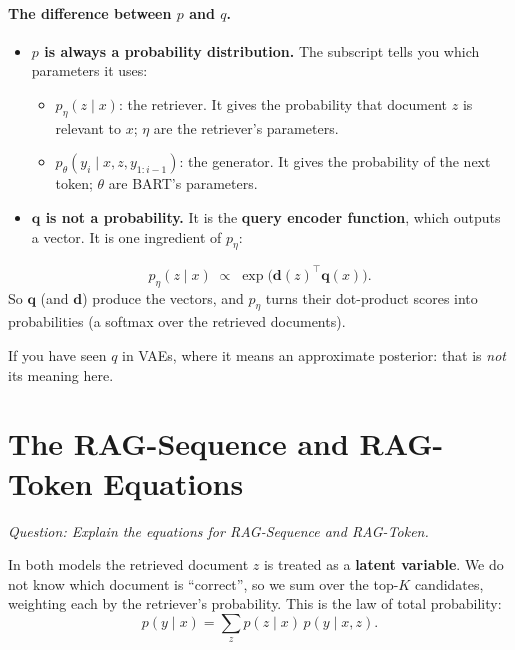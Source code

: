 \documentclass[11pt]{article}
\newcommand{\question}[1]{\noindent\textit{Question: #1}\par\medskip}
\begin{document}
\paragraph{The difference between $p$ and $q$.}
\begin{itemize}[nosep]
  \item \textbf{$p$ is always a probability distribution.} The subscript tells you which parameters it uses:
  \begin{itemize}[nosep]
    \item $p_\eta(z \mid x)$: the retriever. It gives the probability that document $z$ is relevant to $x$; $\eta$ are the retriever's parameters.
    \item $p_\theta(y_i \mid x, z, y_{1:i-1})$: the generator. It gives the probability of the next token; $\theta$ are BART's parameters.
  \end{itemize}
  \item \textbf{$\mathbf{q}$ is not a probability.} It is the \textbf{query encoder function}, which outputs a vector. It is one ingredient of $p_\eta$:
\end{itemize}
\begin{equation}
  p_\eta(z \mid x) \;\propto\; \exp\!\big(\mathbf{d}(z)^{\top}\mathbf{q}(x)\big).
\end{equation}
So $\mathbf{q}$ (and $\mathbf{d}$) produce the vectors, and $p_\eta$ turns their dot-product scores into probabilities (a softmax over the retrieved documents).

If you have seen $q$ in VAEs, where it means an approximate posterior: that is \emph{not} its meaning here.

\section{The RAG-Sequence and RAG-Token Equations}\label{sec:equations}
\question{Explain the equations for RAG-Sequence and RAG-Token.}

In both models the retrieved document $z$ is treated as a \textbf{latent variable}. We do not know which document is ``correct'', so we sum over the top-$K$ candidates, weighting each by the retriever's probability. This is the law of total probability:
\begin{equation}
  p(y \mid x) = \sum_z p(z \mid x)\, p(y \mid x, z).
\end{equation}
\end{document}
